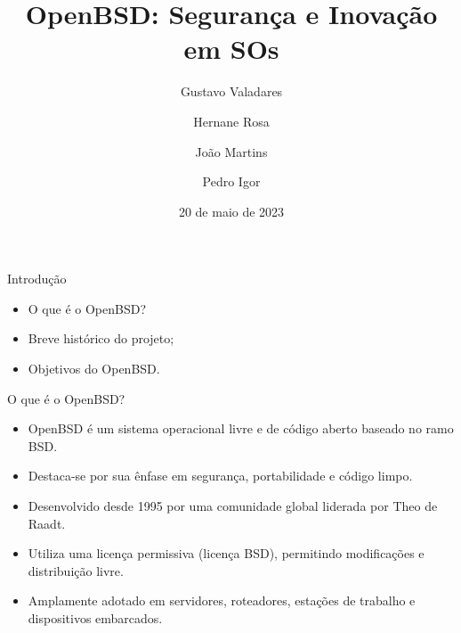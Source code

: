 \documentclass[9pt,xcolor=table]{beamer}
\date{20 de maio de 2023}
\title{OpenBSD: Segurança e Inovação em SOs}
\institute[PUC]{Pontifícia Universidade Católica de Minas Gerais}
\author[Gustavo Valadares, Hernane Rosa, João Víctor, Pedro Igor]{Gustavo Valadares \and Hernane Rosa \and João Martins \and Pedro Igor}
\begin{document}
\begin{frame}
  \titlepage
\end{frame}
\begin{frame}{Introdução}
  \begin{itemize}
    \item O que é o OpenBSD?
    \item Breve histórico do projeto;
    \item Objetivos do OpenBSD.
  \end{itemize}
\end{frame}
\begin{frame}{O que é o OpenBSD?}
  \begin{itemize}
    \item OpenBSD é um sistema operacional livre e de código aberto baseado no ramo BSD.
    \item Destaca-se por sua ênfase em segurança, portabilidade e código limpo.
    \item Desenvolvido desde 1995 por uma comunidade global liderada por Theo de Raadt.
    \item Utiliza uma licença permissiva (licença BSD), permitindo modificações e distribuição livre.
    \item Amplamente adotado em servidores, roteadores, estações de trabalho e dispositivos embarcados.
  \end{itemize}
\end{frame}
\end{document}
